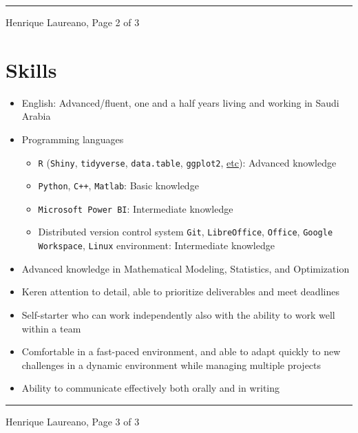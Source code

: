 \documentclass[12pt]{article}
\newcommand{\horrule}[1]{\noindent\rule{\linewidth}{#1}}
\begin{document}
\vspace{\fill}
\horrule{1pt}
\noindent Henrique Laureano, \hfill Page 2 of 3

\section*{Skills}

\begin{itemize}
 \item English: Advanced/fluent, one and a half years living and working
       in Saudi Arabia
 \item Programming languages
  \begin{itemize}
   \item \texttt{R} (\texttt{Shiny}, \texttt{tidyverse},
     \texttt{data.table}, \texttt{ggplot2},
     \href{https://henriquelaureano.github.io/visualizations/}{\color{blue}etc}):
         Advanced knowledge
   \item \texttt{Python}, \texttt{C++}, \texttt{Matlab}: Basic knowledge
   \item \texttt{Microsoft Power BI}: Intermediate knowledge 
   \item Distributed version control system \texttt{Git},
         \texttt{LibreOffice}, \texttt{Office},
         \texttt{Google Workspace}, \texttt{Linux} environment:
         Intermediate knowledge
  \end{itemize}
 \item Advanced knowledge in Mathematical Modeling, Statistics, and
       Optimization
 \item Keren attention to detail, able to prioritize deliverables and meet deadlines
 \item Self-starter who can work independently also with the ability to work well
       within a team
 \item Comfortable in a fast-paced environment, and able to adapt quickly to new
       challenges in a dynamic environment while managing multiple projects
 \item Ability to communicate effectively both orally and in writing
\end{itemize}

\vspace{\fill}
\horrule{1pt}
\noindent Henrique Laureano, \hfill Page 3 of 3
\end{document}
